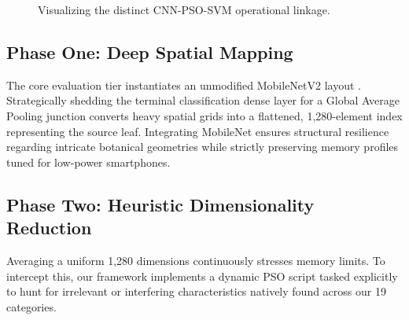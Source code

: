 \documentclass[conference]{IEEEtran}
\begin{document}
\begin{figure}[htbp]
\centering
{}
\caption{Visualizing the distinct CNN-PSO-SVM operational linkage.}
\label{fig:architecture}
\end{figure}

\subsection{Phase One: Deep Spatial Mapping}
The core evaluation tier instantiates an unmodified MobileNetV2 layout \cite{howard2018}. Strategically shedding the terminal classification dense layer for a Global Average Pooling junction converts heavy spatial grids into a flattened, 1,280-element index representing the source leaf. Integrating MobileNet ensures structural resilience regarding intricate botanical geometries while strictly preserving memory profiles tuned for low-power smartphones. 

\subsection{Phase Two: Heuristic Dimensionality Reduction}

Averaging a uniform 1,280 dimensions continuously stresses memory limits. To intercept this, our framework implements a dynamic PSO script \cite{kennedy1995} tasked explicitly to hunt for irrelevant or interfering characteristics natively found across our 19 categories. 
\end{document}
